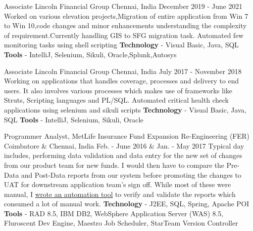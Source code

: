 

\begin{cventries}

  \cventry
    {Associate} %
    {Lincoln Financial Group} %
    {Chennai, India} %
    {December 2019 - June 2021} %
    {
        Worked on various elevation projects,Migration of entire application from Win 7 to Win 10,code changes and minor enhancements understanding the complexity of requirement.Currently handling GIS to SFG migration task.
        \newline
        Automated few monitoring tasks using shell scripting
        \newline
        \textbf{Technology} - Visual Basic, Java, SQL \newline
        \textbf{Tools} - IntelliJ, Selenium, Sikuli, Oracle,Splunk,Autosys
    }

  \cventry
    {Associate} %
    {Lincoln Financial Group} %
    {Chennai, India} %
    {July 2017 - November 2018} %
    {
        Working on applications that handles coverage, processes and delivery to end users. It also involves various processes which makes use of frameworks like Struts, Scripting languages and PL/SQL.
        \newline
        Automated critical health check applications using selenium and sikuli scripts\newline
        \textbf{Technology} - Visual Basic, Java, SQL \newline
        \textbf{Tools} - IntelliJ, Selenium, Sikuli, Oracle
    }

  \cventry
    {Programmer Analyst, MetLife Insurance} %
    {Fund Expansion Re-Engineering (FER)} %
    {Coimbatore \& Chennai, India} %
    {Feb. - June 2016 \& Jan. - May 2017} %
    {
        Typical day includes, performing data validation and data entry for the new set of changes from our product team for new funds. I would then have to compare the Pre-Data and Post-Data reports from our system before promoting the changes to UAT for downstream application team's sign off. While most of these were manual, I \underline{wrote an automation tool} to verify and validate the reports which consumed a lot of manual work.
        \newline
        \textbf{Technology} - J2EE, SQL, Spring, Apache POI \newline
        \textbf{Tools} - RAD 8.5, IBM DB2, WebSphere Application Server (WAS) 8.5, Fluroscent Dev Engine, Maestro Job Scheduler, StarTeam Version Controller
    }


\end{cventries}
